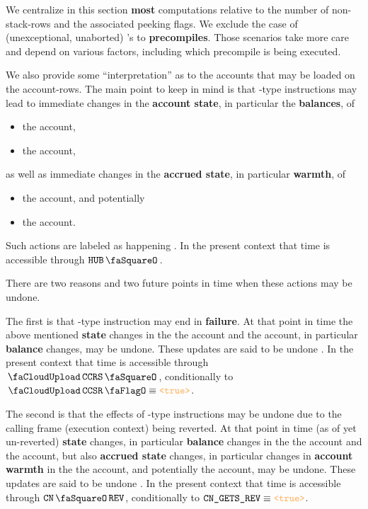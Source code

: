 We centralize in this section \textbf{most} computations relative to the number of non-stack-rows and the associated peeking flags.
We exclude the case of (unexceptional, unaborted) 's to \textbf{precompiles}.
Those scenarios take more care and depend on various factors, including which precompile is being executed.

We also provide some ``interpretation'' as to the accounts that may be loaded on the account-rows.
The main point to keep in mind is that -type instructions may lead to
immediate changes in the \textbf{account state}, in particular the \textbf{balances}, of
\begin{itemize}
	\item the \callerName{} account,
	\item the \calleeName{} account,
\end{itemize}
as well as immediate changes in the \textbf{accrued state}, in particular \textbf{warmth}, of
\begin{itemize}
	\item the \calleeName{} account, and potentially
	\item the \delegateName{} account.
\end{itemize}
Such actions are labeled as happening \atDoingTime{}.
In the present context that time is accessible through $\hubStamp{}$.

There are two reasons and two future points in time when these actions may be undone.

The first is that -type instruction may end in \textbf{failure}.
At that point in time the above mentioned \textbf{state} changes in the
the \callerName{} account and
the \calleeName{} account,
in particular \textbf{balance} changes, may be undone.
These updates are said to be undone \atFailureTime{}.
In the present context that time is accessible through $\miscChildRevertStamp{}$,
conditionally to $\miscChildSelfReverts{} \equiv \true$.

The second is that the effects of -type instructions may be undone due to the calling frame (execution context) being reverted.
At that point in time (as of yet un-reverted) \textbf{state} changes, in particular \textbf{balance} changes in the
the \callerName{} account and
the \calleeName{} account,
but also \textbf{accrued state} changes, in particular changes in \textbf{account warmth} in the
the \calleeName{} account, and potentially
the \delegateName{} account,
may be undone.
These updates are said to be undone \atRevertTime{}.
In the present context that time is accessible through $\cnRevStamp{}$,
conditionally to $\cnGetsRev{} \equiv \true$.


